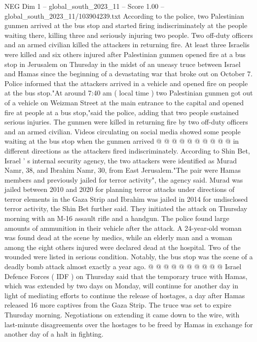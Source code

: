\begin{textsample}{NEG Dim 1 – global\_south\_2023\_11 – Score 1.00 – global\_south\_2023\_11/103904239.txt}  \label{ex:f1_neg_233}
According to the police, two Palestinian gunmen arrived at the bus stop and started firing indiscriminately at the people waiting there, killing three and seriously injuring two people.
Two off-duty officers and an armed civilian killed the attackers in returning fire.
At least three Israelis were killed and six others injured after Palestinian gunmen opened fire at a bus stop in Jerusalem on Thursday in the midst of an uneasy truce between Israel and Hamas since the beginning of a devastating war that broke out on October 7.
Police informed that the attackers arrived in a vehicle and opened fire on people at the bus stop."At around 7:40 am ( local time ) two Palestinian gunmen got out of a vehicle on Weizman Street at the main entrance to the capital and opened fire at people at a bus stop,"said the police, adding that two people sustained serious injuries.
The gunmen were killed in returning fire by two off-duty officers and an armed civilian.
Videos circulating on social media showed some people waiting at the bus stop when the gunmen arrived @ @ @ @ @ @ @ @ @ @ in different directions as the attackers fired indiscriminately.
According to Shin Bet, Israel ' s internal security agency, the two attackers were identified as Murad Namr, 38, and Ibrahim Namr, 30, from East Jerusalem."The pair were Hamas members and previously jailed for terror activity", the agency said.
Murad was jailed between 2010 and 2020 for planning terror attacks under directions of terror elements in the Gaza Strip and Ibrahim was jailed in 2014 for undisclosed terror activity, the Shin Bet further said.
They initiated the attack on Thursday morning with an M-16 assault rifle and a handgun.
The police found large amounts of ammunition in their vehicle after the attack.
A 24-year-old woman was found dead at the scene by medics, while an elderly man and a woman among the eight others injured were declared dead at the hospital.
Two of the wounded were listed in serious condition.
Notably, the bus stop was the scene of a deadly bomb attack almost exactly a year ago. @ @ @ @ @ @ @ @ @ @ Israel Defence Forces ( IDF ) on Thursday said that the temporary truce with Hamas, which was extended by two days on Monday, will continue for another day in light of mediating efforts to continue the release of hostages, a day after Hamas released 16 more captives from the Gaza Strip.
The truce was set to expire Thursday morning.
Negotiations on extending it came down to the wire, with last-minute disagreements over the hostages to be freed by Hamas in exchange for another day of a halt in fighting.

\end{textsample}
